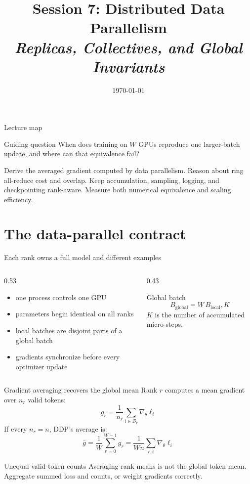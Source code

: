 \documentclass[handout]{beamer}
\title[TLM -- Session 07]{Session 7: Distributed Data Parallelism\\[4pt]
\normalsize\itshape Replicas, Collectives, and Global Invariants}
\date{\today}
\begin{document}
\makelecturetitle
\begin{frame}{Lecture map}
  \tableofcontents
  \vfill
  \begin{block}{Guiding question}
    When does training on $W$ GPUs reproduce one larger-batch update, and where can that equivalence fail?
  \end{block}
\end{frame}
\learninggoals
  {Derive the averaged gradient computed by data parallelism.}
  {Reason about ring all-reduce cost and overlap.}
  {Keep accumulation, sampling, logging, and checkpointing rank-aware.}
  {Measure both numerical equivalence and scaling efficiency.}

\section{The data-parallel contract}

\begin{frame}{Each rank owns a full model and different examples}
  \begin{columns}[c]
    \begin{column}{0.53\linewidth}
      \begin{itemize}
        \setlength{\itemsep}{7pt}
        \item one process controls one GPU
        \item parameters begin identical on all ranks
        \item local batches are disjoint parts of a global batch
        \item gradients synchronize before every optimizer update
      \end{itemize}
    \end{column}
    \begin{column}{0.43\linewidth}
      \begin{block}{Global batch}
        \[
          B_{\text{global}}=W\,B_{\text{local}},K
        \]
        $K$ is the number of accumulated micro-steps.
      \end{block}
    \end{column}
  \end{columns}
\end{frame}

\begin{frame}{Gradient averaging recovers the global mean}
  Rank $r$ computes a mean gradient over $n_r$ valid tokens:
  \[
    g_r=\frac{1}{n_r}\sum_{i\in\mathcal{B}_r}\nabla_\theta \ell_i
  \]
  If every $n_r=n$, DDP's average is:
  \[
    \bar g=\frac{1}{W}\sum_{r=0}^{W-1}g_r
    =\frac{1}{Wn}\sum_{r,i}\nabla_\theta\ell_i
  \]
  \begin{alertblock}{Unequal valid-token counts}
    Averaging rank means is not the global token mean. Aggregate summed loss and counts, or weight gradients correctly.
  \end{alertblock}
\end{frame}
\end{document}
